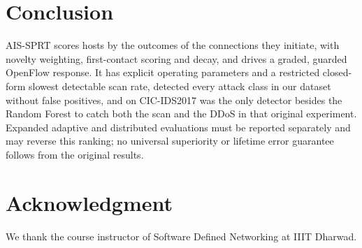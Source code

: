 \documentclass[conference]{IEEEtran}
\begin{document}
\section{Conclusion}
AIS-SPRT scores hosts by the outcomes of the connections they initiate, with novelty weighting, first-contact scoring and
decay, and drives a graded, guarded OpenFlow response. It has explicit operating parameters and a restricted closed-form slowest
detectable scan rate, detected every attack class in our dataset without false positives, and on CIC-IDS2017 was the only
detector besides the Random Forest to catch both the scan and the DDoS in that original experiment. Expanded adaptive
and distributed evaluations must be reported separately and may reverse this ranking; no universal superiority or
lifetime error guarantee follows from the original results.

\section*{Acknowledgment}
We thank the course instructor of Software Defined Networking at IIIT Dharwad.




\end{document}
